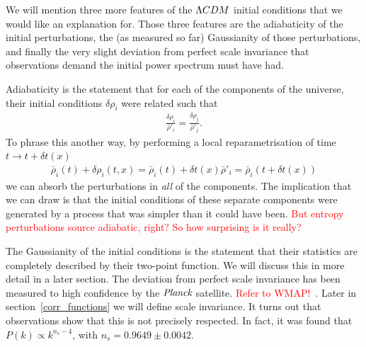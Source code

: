     We will mention three more features of the $\Lambda CDM$ initial conditions that we would
    like an explanation for. Those three features are the adiabaticity of the initial
    perturbations, the (as measured so far) Gaussianity of those perturbations, and finally
    the very slight deviation from perfect scale invariance that observations demand the
    initial power spectrum must have had.


    Adiabaticity is the statement that for each of the components of the universe, their
    initial conditions $\delta\rho_i$ were related such that
    \begin{align}
        \frac{\delta\rho_i}{\bar{\rho}'_i} = \frac{\delta\rho_j}{\bar{\rho}'_j}.
    \end{align}
    To phrase this another way, by performing a local reparametrisation of time $t\rightarrow t+\delta t(x)$
    \begin{align}
        \bar{\rho}_i(t)+\delta \rho_i(t,x) = \bar{\rho}_i(t)+\delta t(x)\bar{\rho}'_i
        = \bar{\rho}_i(t+\delta t(x))
    \end{align}
    we can absorb the perturbations in \textit{all} of the components. The implication that we can draw
    is that the initial conditions of these separate components were generated by a process that was simpler than
    it could have been.
\textcolor{red}{But entropy perturbations source adiabatic, right? So how surprising is it really?}


    The Gaussianity of the initial conditions is the statement that their statistics are completely described by
    their two-point function. We will discuss this in more detail in a later section.
    The deviation from perfect scale invariance has been measured to high confidence by the $\textit{Planck}$
    satellite. \textcolor{red}{Refer to WMAP!}~\cite{Senatore_wmap_2009}.
    Later in section~\ref{corr_functions} we will define scale invariance.
    It turns out that observations show that this is not precisely respected.
    In fact, it was found that $P(k)\propto k^{n_s-4}$, with $n_s=0.9649 \pm 0.0042$.

